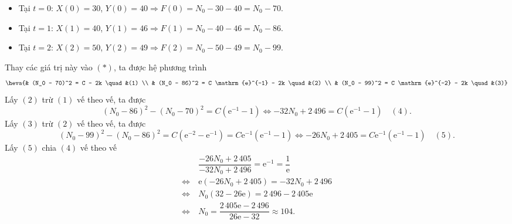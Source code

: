 \begin{ex}
{		\begin{itemize}
			\item Tại $t=0$: $X(0) = 30$, $Y(0) = 40 \Rightarrow F(0) = N_0 - 30 - 40 = N_0 - 70$.
			\item Tại $t=1$: $X(1) = 40$, $Y(1) = 46 \Rightarrow F(1) = N_0 - 40 - 46 = N_0 - 86$.
			\item Tại $t=2$: $X(2) = 50$, $Y(2) = 49 \Rightarrow F(2) = N_0 - 50 - 49 = N_0 - 99$.
		\end{itemize}
		Thay các giá trị này vào $(*)$, ta được hệ phương trình
		\[ \heva{& (N_0 - 70)^2 = C - 2k \quad &(1) \\ & (N_0 - 86)^2 = C \mathrm{e}^{-1} - 2k \quad &(2) \\ & (N_0 - 99)^2 = C \mathrm{e}^{-2} - 2k \quad &(3)} \]
		Lấy $(2)$ trừ $(1)$ vế theo vế, ta được
		\[ (N_0 - 86)^2 - (N_0 - 70)^2 = C(\mathrm{e}^{-1} - 1) \Leftrightarrow -32N_0 + 2\,496 = C(\mathrm{e}^{-1} - 1) \quad (4). \]
		Lấy $(3)$ trừ $(2)$ vế theo vế, ta được
		\[ (N_0 - 99)^2 - (N_0 - 86)^2 = C(\mathrm{e}^{-2} - \mathrm{e}^{-1}) = C \mathrm{e}^{-1}(\mathrm{e}^{-1} - 1) \Leftrightarrow -26N_0 + 2\,405 = C \mathrm{e}^{-1}(\mathrm{e}^{-1} - 1) \quad (5). \]
		Lấy $(5)$ chia $(4)$ vế theo vế
		\begin{align*}
			&\dfrac{-26N_0 + 2\,405}{-32N_0 + 2\,496} = \mathrm{e}^{-1} = \dfrac{1}{\mathrm{e}} \\
			\Leftrightarrow \ & \mathrm{e}(-26N_0 + 2\,405) = -32N_0 + 2\,496 \\
			\Leftrightarrow \ & N_0 (32 - 26\mathrm{e}) = 2\,496 - 2\,405\mathrm{e} \\
			\Leftrightarrow \ &N_0 = \dfrac{2\,405\mathrm{e} - 2\,496}{26\mathrm{e} - 32} \approx 104.
		\end{align*}
	}
\end{ex}
